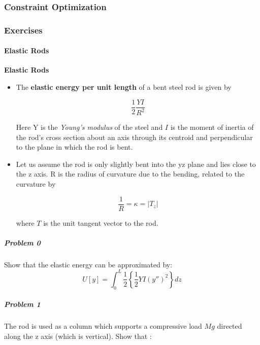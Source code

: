\subsubsection{Constraint Optimization}

\subsubsection{Exercises}

\paragraph{Elastic Rods}

\begin{framed}
\textbf{Elastic Rods}\\
\begin{itemize}
\item The \textbf{elastic energy per unit length} of a bent steel rod is given by

\begin{equation}
\frac{1}{2}\frac{YI}{R^2}
\end{equation}


Here Y is the \textit{Young's modulus} of the steel and $I$ is the moment of inertia of the rod's cross section about an axis through its centroid and perpendicular to the plane in which the rod is bent.
\end{itemize}

\begin{itemize}
\item Let us assume the rod is only slightly bent into the yz plane and lies close to the z axis. R is the radius of curvature due to the bending, related to the curvature by

\begin{equation}
\frac{1}{R}=\kappa = |T_z|
\end{equation}


where $T$ is the unit tangent vector to the rod.
\end{itemize}

\subparagraph{Problem 0}

Show that the elastic energy can be approximated by:
\begin{equation}
\boxed{U[y]=\int_0^L \frac12 \left\{ \frac{1}{2} YI(y'')^2 \right\}dz}
\end{equation}

\subparagraph{Problem 1}

The rod is used as a column which supports a compressive load $Mg$ directed along the z axis (which is vertical). Show that :


\end{framed}
